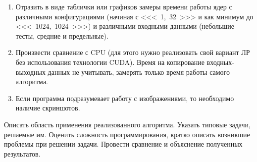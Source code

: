 \documentclass[12pt]{article}
\begin{document}
\begin{enumerate}
	\item Отразить в виде таблички или графиков замеры времени работы ядер с
	      различными конфигурациями (начиная с <<< 1, 32 >>> и как минимум до
	      <<< 1024, 1024 >>>) и различными входными данными (небольшие тесты,
	      средние и предельные).

	\item Произвести сравнение с CPU (для этого нужно реализовать свой вариант ЛР без
	      использования технологии CUDA). Время на копирование входных-выходных
	      данных не учитывать, замерять только время работы самого алгоритма.

	\item Если программа подразумевает работу с изображениями, то необходимо
	      наличие скриншотов.
\end{enumerate}



Описать область применения реализованного алгоритма. Указать типовые задачи,
решаемые им. Оценить сложность программирования, кратко описать возникшие
проблемы при решении задачи. Провести сравнение и объяснение полученных
результатов.
\end{document}
